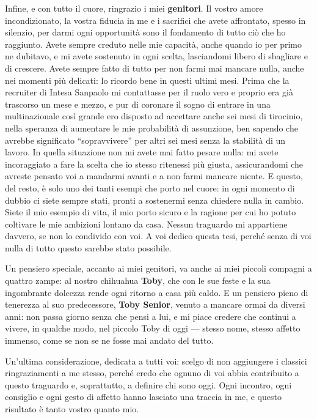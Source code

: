 Infine, e con tutto il cuore, ringrazio i miei \textbf{genitori}. Il vostro amore incondizionato, la vostra fiducia in me e i sacrifici che avete affrontato, spesso in silenzio, per darmi ogni opportunità sono il fondamento di tutto ciò che ho raggiunto. Avete sempre creduto nelle mie capacità, anche quando io per primo ne dubitavo, e mi avete sostenuto in ogni scelta, lasciandomi libero di sbagliare e di crescere. Avete sempre fatto di tutto per non farmi mai mancare nulla, anche nei momenti più delicati: lo ricordo bene in questi ultimi mesi. Prima che la recruiter di Intesa Sanpaolo mi contattasse per il ruolo vero e proprio era già trascorso un mese e mezzo, e pur di coronare il sogno di entrare in una multinazionale così grande ero disposto ad accettare anche sei mesi di tirocinio, nella speranza di aumentare le mie probabilità di assunzione, ben sapendo che avrebbe significato ``sopravvivere'' per altri sei mesi senza la stabilità di un lavoro. In quella situazione non mi avete mai fatto pesare nulla: mi avete incoraggiato a fare la scelta che io stesso ritenessi più giusta, assicurandomi che avreste pensato voi a mandarmi avanti e a non farmi mancare niente. E questo, del resto, è solo uno dei tanti esempi che porto nel cuore: in ogni momento di dubbio ci siete sempre stati, pronti a sostenermi senza chiedere nulla in cambio. Siete il mio esempio di vita, il mio porto sicuro e la ragione per cui ho potuto coltivare le mie ambizioni lontano da casa. Nessun traguardo mi appartiene davvero, se non lo condivido con voi. A voi dedico questa tesi, perché senza di voi nulla di tutto questo sarebbe stato possibile.

Un pensiero speciale, accanto ai miei genitori, va anche ai miei piccoli compagni a quattro zampe: al nostro chihuahua \textbf{Toby}, che con le sue feste e la sua ingombrante dolcezza rende ogni ritorno a casa più caldo. E un pensiero pieno di tenerezza al suo predecessore, \textbf{Toby Senior}, venuto a mancare ormai da diversi anni: non passa giorno senza che pensi a lui, e mi piace credere che continui a vivere, in qualche modo, nel piccolo Toby di oggi --- stesso nome, stesso affetto immenso, come se non se ne fosse mai andato del tutto.

Un'ultima considerazione, dedicata a tutti voi: scelgo di non aggiungere i classici ringraziamenti a me stesso, perché credo che ognuno di voi abbia contribuito a questo traguardo e, soprattutto, a definire chi sono oggi. Ogni incontro, ogni consiglio e ogni gesto di affetto hanno lasciato una traccia in me, e questo risultato è tanto vostro quanto mio.

